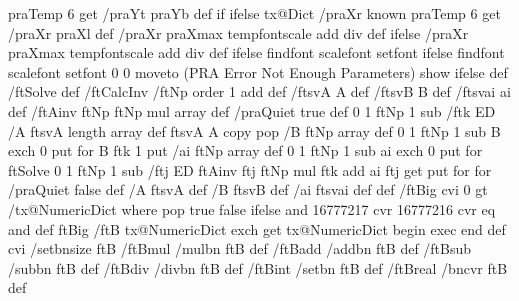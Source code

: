 {{{{         { praTemp 6 get {/praYt praYb def} if } ifelse
         tx@Dict /praXr known {
         praTemp 6 get { /praXr praXl def }{ /praXr praXmax tempfontscale add \pst@number\psxunit\space div def } ifelse }{%
         /praXr praXmax tempfontscale add \pst@number\psxunit\space div def } ifelse
         \psk@PSfont\space findfont \psk@fontscale\space scalefont setfont } ifelse
         }{ \psk@PSfont\space findfont \psk@fontscale\space scalefont setfont
         0 0 moveto (PRA Error Not Enough Parameters) show } ifelse } def
  /ftSolve { \tx@GaussSolve } def
  /ftCalcInv {
    /ftNp order 1 add def
    /ftsvA A def /ftsvB B def /ftsvai ai def
    /ftAinv ftNp ftNp mul array def
    /praQuiet true def
    0 1 ftNp 1 sub { /ftk ED
      /A ftsvA length array def ftsvA A copy pop
      /B ftNp array def 0 1 ftNp 1 sub { B exch 0 put } for
      B ftk 1 put
      /ai ftNp array def 0 1 ftNp 1 sub { ai exch 0 put } for
      ftSolve
      0 1 ftNp 1 sub { /ftj ED ftAinv ftj ftNp mul ftk add ai ftj get put } for
    } for
    /praQuiet false def
    /A ftsvA def /B ftsvB def /ai ftsvai def
  } def
  /ftBig \psk@bignum\space cvi 0 gt /tx@NumericDict where { pop true }{ false } ifelse and
    16777217 cvr 16777216 cvr eq and def
  ftBig {
    /ftB { tx@NumericDict exch get tx@NumericDict begin exec end } def
    \psk@bignum\space cvi /setbnsize ftB
    /ftBmul { /mulbn ftB } def /ftBadd { /addbn ftB } def
    /ftBsub { /subbn ftB } def /ftBdiv { /divbn ftB } def
    /ftBint { /setbn ftB } def  %
    /ftBreal { /bncvr ftB } def %
}}
